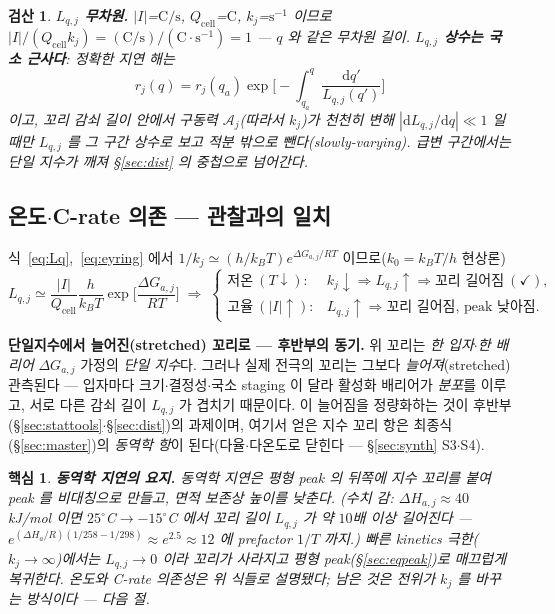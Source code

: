 \documentclass[11pt,a4paper]{article}
\newtheorem*{keybox}{핵심}
\newtheorem*{verifybox}{검산}
\newcommand{\dd}{\mathrm{d}}
\newcommand{\cell}{\mathrm{cell}}
\begin{document}
\begin{verifybox}
\textbf{$L_{q,j}$ 무차원.} $|I|$=$\mathrm{C/s}$, $Q_\cell$=$\mathrm C$, $k_j$=$\mathrm{s^{-1}}$ 이므로
$|I|/(Q_\cell k_j)=(\mathrm{C/s})/(\mathrm C\cdot\mathrm{s^{-1}})=1$ — $q$ 와 같은 무차원 길이. \textbf{$L_{q,j}$ 상수는
\emph{국소 근사}다}: 정확한 지연 해는
\[ r_j(q)=r_j(q_a)\exp\!\Big[-\int_{q_a}^q\frac{\dd q'}{L_{q,j}(q')}\Big] \]
이고, 꼬리 감쇠 길이 안에서 구동력 $\mathcal A_j$(따라서 $k_j$)가 천천히 변해 $|\dd L_{q,j}/\dd q|\ll1$ 일 때만 $L_{q,j}$ 를
그 구간 상수로 보고 적분 밖으로 뺀다(slowly-varying). 급변 구간에서는 단일 지수가 깨져 \S\ref{sec:dist} 의 중첩으로 넘어간다.
\end{verifybox}

\subsection{온도$\cdot$C-rate 의존 — 관찰과의 일치}
식~\eqref{eq:Lq},~\eqref{eq:eyring} 에서 $1/k_j\simeq(h/k_BT)e^{\Delta G_{a,j}/RT}$ 이므로($k_0=k_BT/h$ 현상론)
\begin{equation}
L_{q,j}\simeq\frac{|I|}{Q_\cell}\frac{h}{k_BT}\exp\!\Big[\frac{\Delta G_{a,j}}{RT}\Big]
\;\Longrightarrow\;
\begin{cases}
\text{저온}\ (T\downarrow): & k_j\downarrow\Rightarrow L_{q,j}\uparrow\Rightarrow\text{꼬리 길어짐}\ (\checkmark),\\[2pt]
\text{고율}\ (|I|\uparrow): & L_{q,j}\uparrow\Rightarrow\text{꼬리 길어짐, peak 낮아짐}.
\end{cases}
\label{eq:tailTC}
\end{equation}

\textbf{단일지수에서 늘어진(stretched) 꼬리로 — 후반부의 동기.} 위 꼬리는 \emph{한 입자$\cdot$한 배리어}
$\Delta G_{a,j}$ 가정의 \emph{단일 지수}다. 그러나 실제 전극의 꼬리는 그보다 \emph{늘어져}(stretched) 관측된다 —
입자마다 크기$\cdot$결정성$\cdot$국소 staging 이 달라 활성화 배리어가 \emph{분포}를 이루고, 서로 다른 감쇠 길이
$L_{q,j}$ 가 겹치기 때문이다. 이 늘어짐을 정량화하는 것이 후반부(\S\ref{sec:stattools}$\cdot$\S\ref{sec:dist})의
과제이며, 여기서 얻은 지수 꼬리 항은 최종식(\S\ref{sec:master})의 \emph{동역학 항}이 된다(다율$\cdot$다온도로
닫힌다 — \S\ref{sec:synth} S3$\cdot$S4).

\begin{keybox}
\textbf{동역학 지연의 요지.} 동역학 지연은 평형 peak 의 \emph{뒤쪽}에 지수 꼬리를 붙여 peak 를 \emph{비대칭}으로 만들고, 면적
보존상 \emph{높이를 낮춘다}. (수치 감: $\Delta H_{a,j}\approx40$ kJ/mol 이면 $25^\circ$C$\to-15^\circ$C 에서 꼬리
길이 $L_{q,j}$ 가 약 $10$배 이상 길어진다 — $e^{(\Delta H_a/R)(1/258-1/298)}\approx e^{2.5}\approx12$ 에 prefactor
$1/T$ 까지.) 빠른 kinetics 극한($k_j\to\infty$)에서는 $L_{q,j}\to0$ 이라 꼬리가 사라지고 평형
peak(\S\ref{sec:eqpeak})로 매끄럽게 복귀한다. \emph{온도와 C-rate 의존성은 위 식들로 설명됐다; 남은 것은 전위가
$k_j$ 를 바꾸는 방식이다 — 다음 절.}
\end{keybox}
\end{document}
